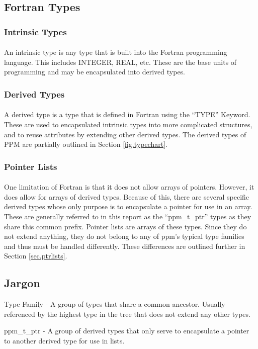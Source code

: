 \documentclass{article}
\begin{document}
\subsection{Fortran Types}
\subsubsection{Intrinsic Types}
\paragraph{}
An intrinsic type is any type that is built into the Fortran programming language. This includes INTEGER, REAL, etc. These are the base units of programming and may be encapsulated into derived types.

\subsubsection{Derived Types}
\paragraph{}
A derived type is a type that is defined in Fortran using the ``TYPE'' Keyword. These are used to encapsulated intrinsic types into more complicated structures, and to reuse attributes by extending other derived types. The derived types of PPM are partially outlined in Section \ref{fig.typechart}.

\subsubsection{Pointer Lists}
\paragraph{}
One limitation of Fortran is that it does not allow arrays of pointers. However, it does allow for arrays of derived types. Because of this, there are several specific derived types whose only purpose is to encapsulate a pointer for use in an array. These are generally referred to in this report as the ``ppm\_t\_ptr'' types as they share this common prefix. Pointer lists are arrays of these types. Since they do not extend anything, they do not belong to any of ppm's typical type families and thus must be handled differently. These differences are outlined further in Section \ref{sec.ptrlists}.

\subsection{Jargon}
\begin{list}{}{}
\item Type Family - A group of types that share a common ancestor. Usually referenced by the highest type in the tree that does not extend any other types.
\item ppm\_t\_ptr - A group of derived types that only serve to encapsulate a pointer to another derived type for use in lists.
\end{list}
\end{document}
